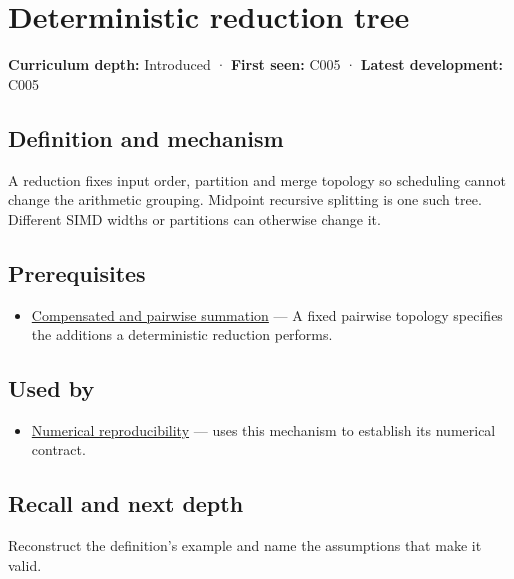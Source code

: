 \hypertarget{appendix-4c8e0238e7ee}{}
\section{Deterministic reduction tree}\label{appendix-4c8e0238e7ee-deterministic-reduction-tree}

\textbf{Curriculum depth:} Introduced · \textbf{First seen:} C005 · \textbf{Latest development:} C005

\subsection{Definition and mechanism}\label{appendix-4c8e0238e7ee-definition-and-mechanism}

A reduction fixes input order, partition and merge topology so scheduling cannot change the arithmetic grouping. Midpoint recursive splitting is one such tree. Different SIMD widths or partitions can otherwise change it.

\subsection{Prerequisites}\label{appendix-4c8e0238e7ee-prerequisites}

\begin{itemize}
\tightlist
\item
  \hyperref[appendix-df318da57389]{Compensated and pairwise summation} --- A fixed pairwise topology specifies the additions a deterministic reduction performs.
\end{itemize}

\subsection{Used by}\label{appendix-4c8e0238e7ee-used-by}

\begin{itemize}
\tightlist
\item
  \hyperref[appendix-5f1a2c3f97ff]{Numerical reproducibility} --- uses this mechanism to establish its numerical contract.
\end{itemize}

\subsection{Recall and next depth}\label{appendix-4c8e0238e7ee-recall-and-next-depth}

Reconstruct the definition's example and name the assumptions that make it valid.

